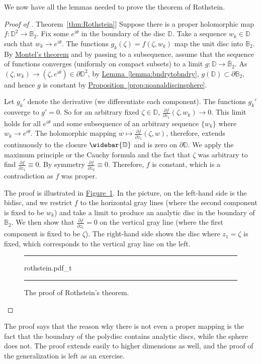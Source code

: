 \documentclass[12pt,openany]{book}
\newcommand{\D}{{\mathbb{D}}}
\newcommand{\bB}{{\mathbb{B}}}
\theoremstyle{plain}
\theoremstyle{remark}
\theoremstyle{definition}
\newenvironment{myfig}{%
\begin{figure}[h!t]
\noindent\rule{\textwidth}{0.5pt}\vspace{12pt}\par\centering}%
{\par\noindent\rule{\textwidth}{0.5pt}
\end{figure}}
\theoremstyle{exercise}
\theoremstyle{example}
\newcommand{\figureref}[1]{\hyperref[#1]{Figure~\ref*{#1}}}
\newcommand{\thmref}[1]{\hyperref[#1]{Theorem~\ref*{#1}}}
\newcommand{\propref}[1]{\hyperref[#1]{Proposition~\ref*{#1}}}
\newcommand{\lemmaref}[1]{\hyperref[#1]{Lemma~\ref*{#1}}}
\begin{document}
We now have all the lemmas needed to prove the theorem of Rothstein.

\begin{proof}[Proof of \thmref{thm:Rothstein}]
Suppose there is a proper holomorphic map $f \colon \D^2
\to \bB_2$.
Fix some $e^{i\theta}$ in the boundary of the disc $\D$.  Take a sequence
$w_k \in \D$ such that $w_k \to e^{i\theta}$.   The functions
$g_k(\zeta) =  f(\zeta,w_k)$ map the unit disc into $\bB_2$.
By \hyperref[thm:onevarmontel]{Montel's theorem} and
by passing to a subsequence, assume that
the sequence of functions converges (uniformly on compact subsets) to
a limit $g \colon \D \to \overline{\bB}_2$.  As $(\zeta,w_k) \to
(\zeta,e^{i\theta}) \in \partial \D^2$, by
\lemmaref{lemma:bndrytobndry}, $g(\D) \subset \partial \bB_2$,
and hence $g$ is constant by \propref{prop:noanaldiscinsphere}.

Let $g_k'$ denote the derivative (we differentiate each component).
The functions $g_k'$ converge to $g' = 0$.
So for an arbitrary fixed $\zeta \in \D$,
$\frac{\partial f}{\partial z_1} (\zeta, w_k) \to 0$.
This limit holds for all $e^{i\theta}$ and some subsequence of
an arbitrary sequence $\{ w_k \}$ where $w_k \to e^{i\theta}$.  The
holomorphic mapping $w \mapsto \frac{\partial f}{\partial z_1} (\zeta, w)$,
therefore, extends continuously
to the closure $\widebar{\D}$ and is zero on $\partial \D$.
We apply the maximum
principle or the Cauchy formula and the fact that $\zeta$ was arbitrary to find
$\frac{\partial f}{\partial z_1} \equiv 0$.  By symmetry
$\frac{\partial f}{\partial z_2} \equiv 0$.  Therefore, $f$ is constant,
which is a contradiction as $f$ was proper.

The proof is illustrated in \figureref{fig:rothstein}.
In the picture, on the left-hand side is the bidisc, and we
restrict $f$ to the horizontal gray lines (where the second component is
fixed to be $w_k$) and take a limit to produce an analytic disc
in the boundary of $\bB_2$.  We then show that $\frac{\partial f}{\partial
z_1} = 0$ on the vertical gray line (where the first component is fixed to
be $\zeta$).  The right-hand side shows the disc where $z_1 = \zeta$ is
fixed, which corresponds to the vertical gray line on the left.
\begin{myfig}
{rothstein.pdf_t}
\caption{The proof of Rothstein's theorem.\label{fig:rothstein}}
\end{myfig}
\end{proof}

The proof says that the reason why there is not even a proper mapping is the fact
that the boundary of the polydisc contains analytic discs, while
the sphere does not.
The proof extends easily to higher dimensions as well, and the proof
of the generalization is left as an exercise.
\end{document}
